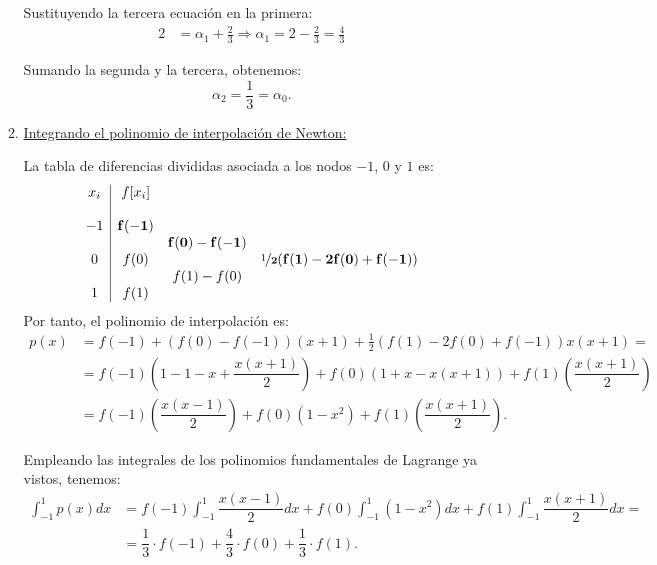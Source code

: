 \begin{ejercicio}
\begin{enumerate}
\begin{enumerate}
            Sustituyendo la tercera ecuación en la primera:
            \begin{align*}
                2 &= \alpha_1 + \frac{2}{3}\Longrightarrow \alpha_1 = 2 - \frac{2}{3} = \frac{4}{3}
            \end{align*}

            Sumando la segunda y la tercera, obtenemos:
            \begin{equation*}
                \alpha_2 = \frac{1}{3} = \alpha_0.
            \end{equation*}


            \item \ul{Integrando el polinomio de interpolación de Newton:}
            
            La tabla de diferencias divididas asociada a los nodos $-1$, $0$ y $1$ es:
            \begin{equation*}
                \begin{array}{c|cccc}
                    x_i & f[x_i] \\
                    \\
                    -1 & \mathbf{f(-1)} \\
                    && \mathbf{f(0)-f(-1)} \\
                    0 & f(0) & & \mathbf{\nicefrac{1}{2}(f(1)-2f(0)+f(-1))}\\
                    && f(1)-f(0)\\
                    1 & f(1)
                \end{array}
            \end{equation*}
            Por tanto, el polinomio de interpolación es:
            \begin{align*}
                p(x) &= f(-1) + \left(f(0)-f(-1)\right)(x+1) + \frac{1}{2}\left(f(1)-2f(0)+f(-1)\right)x(x+1)
                =\\&= f(-1)\left(1-1-x+\dfrac{x(x+1)}{2}\right) + f(0)\left(1+x-x(x+1)\right) + f(1)\left(\dfrac{x(x+1)}{2}\right)\\
                &= f(-1)\left(\dfrac{x(x-1)}{2}\right) + f(0)\left(1-x^2\right) + f(1)\left(\dfrac{x(x+1)}{2}\right).
            \end{align*}

            Empleando las integrales de los polinomios fundamentales de Lagrange ya vistos, tenemos:
            \begin{align*}
                \int_{-1}^{1} p(x) dx &= f(-1)\int_{-1}^{1} \dfrac{x(x-1)}{2} dx + f(0)\int_{-1}^{1} (1-x^2) dx + f(1)\int_{-1}^{1} \dfrac{x(x+1)}{2} dx =\\
                &= \dfrac{1}{3}\cdot f(-1) + \dfrac{4}{3}\cdot f(0) + \dfrac{1}{3}\cdot f(1).
            \end{align*}
        \end{enumerate}


\end{enumerate}
\end{ejercicio}
